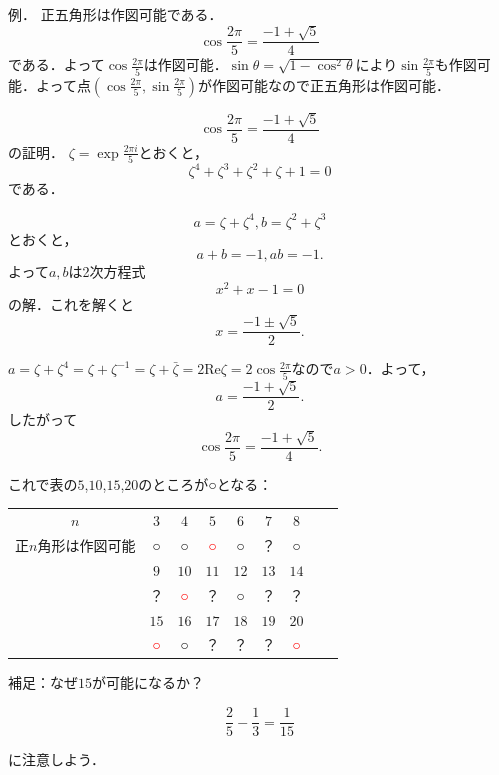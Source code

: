 \documentclass[dvipdfmx,17pt]{beamer}
\theoremstyle{plain}
\begin{document}
\begin{frame}
例． 正五角形は作図可能である．
\[ \cos \frac{2 \pi}{5} = \frac{-1 + \sqrt{5}}{4} \]
である．よって$\cos \frac{2 \pi}{5}$は作図可能．$\sin \theta = \sqrt{1 - \cos^2 \theta}$により$\sin \frac{2 \pi}{5}$も作図可能．よって点$(\cos \frac{2 \pi}{5}, \sin \frac{2 \pi}{5})$が作図可能なので正五角形は作図可能．
\end{frame}

\begin{frame}
\[ \cos \frac{2 \pi}{5} = \frac{-1 + \sqrt{5}}{4} \]
の証明．
$\zeta = \exp \frac{2 \pi i}{5}$とおくと，
\[ \zeta^4 + \zeta^3 + \zeta^2 + \zeta + 1 = 0 \]
である．
\end{frame}

\begin{frame}
\[ a = \zeta + \zeta^4, b = \zeta^2 + \zeta^3 \]
とおくと，
\[ a + b = -1, ab = -1. \]
よって$a, b$は2次方程式
\[ x^2 + x - 1 = 0 \]
の解．これを解くと
\[ x = \frac{-1 \pm \sqrt{5}}{2}. \]
\end{frame}

\begin{frame}
$a =  \zeta + \zeta^4 = \zeta + \zeta^{-1} = \zeta + \bar{\zeta} = 2 \mathrm{Re} \zeta = 2 \cos \frac{2 \pi}{5} $なので$a > 0$．よって，
\[a = \frac{-1 + \sqrt{5}}{2}.\]
したがって
\[\cos \frac{2 \pi}{5} = \frac{-1 + \sqrt{5}}{4}.\]
\end{frame}

\begin{frame}
これで表の$5$,$10$,$15$,$20$のところが○となる：
\small
\begin{table}[h]
  \begin{tabular}{ccccccccc}
    $n$ & $3$ & $4$ & $5$ & $6$ & $7$ & $8$ \\
    正$n$角形は作図可能 & ○ & ○ & \textcolor{red}{○} & ○ & ？ & ○ \\
     & $9$ & $10$ & $11$ & $12$ & $13$ & $14$ \\
     & ？ & \textcolor{red}{○} & ？ & ○ & ？ & ？ \\
     & $15$ & $16$ & $17$ & $18$ & $19$ & $20$ \\
     & \textcolor{red}{○} & ○ & ？ & ？ & ？ & \textcolor{red}{○}
  \end{tabular}
\end{table}
\end{frame}

\begin{frame}
補足：なぜ$15$が可能になるか？

\[\frac{2}{5} - \frac{1}{3} = \frac{1}{15}\]

に注意しよう．
\end{frame}
\end{document}
